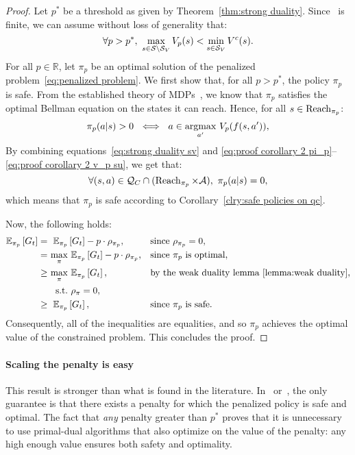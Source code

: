 \begin{proof}
	Let $p^*$ be a threshold as given by Theorem~\ref{thm:strong duality}. Since \Q~is finite, we can assume without loss of generality that:
	 \begin{equation}
	 \forall p > p^*,~\max_{s\in\mathcal{S}\setminus{\ensuremath{\mathcal{S}}_{V}}}V_p(s) < \min_{s\in{\ensuremath{\mathcal{S}}_{V}}}V^c(s). \label{eq:proof corollary 2 v_p su}
	 \end{equation}
	 For all $p\in\mathbb{R}$, let $\pi_p$ be an optimal solution of the penalized problem~\eqref{eq:penalized problem}.  We first show that, for all $p>p^*$, the policy $\pi_p$ is safe. From the established theory of MDPs~\cite{sutton2018reinforcement}, we know that $\pi_p$ satisfies the optimal Bellman equation on the states it can reach. Hence, for all $s\in\operatorname{Reach}_{\pi_p}$:
	\begin{equation}
		\pi_p(a|s) > 0~\iff~a \in \operatorname*{argmax}_{a'}\,V_p(f(s, a')),\label{eq:proof corollary 2 pi_p}
	\end{equation}
	By combining equations~\eqref{eq:strong duality sv} and \eqref{eq:proof corollary 2 pi_p}--\eqref{eq:proof corollary 2 v_p su}, we get that:
	$$
		\forall (s, a) \in \mathcal{Q}_{C}\cap(\operatorname{Reach}_{\pi_p}\times\mathcal{A}),~\pi_p(a|s) = 0,
	$$
	which means that $\pi_p$ is safe according to Corollary~\eqref{clry:safe policies on qc}.\par
	Now, the following holds:
	\begin{equation}
	\begin{alignedat}{5}
		\mathbb{E}_{\pi_p}\left[G_t\right] & =~&\mathbb{E}_{\pi_p}&\left[G_t\right] - p\cdot\rho_{\pi_p}, & &\quad\text{since}~\rho_{\pi_p} = 0,\\
		& =~&\max_\pi&~\mathbb{E}_{\pi_p}\left[G_t\right] - p\cdot\rho_{\pi_p},& &\quad\text{since}~\pi_p~\text{is optimal},\\
		& \geq~& \max_\pi&~\mathbb{E}_{\pi_p}\left[G_t\right],& &\quad\text{by the weak duality lemma~\ref{lemma:weak duality}},\\
		&		& \text{s.t.}&~\rho_\pi = 0,& &\\
		& \geq~& \mathbb{E}_{\pi_p}&\left[G_t\right], & &\quad\text{since}~\pi_p~\text{is safe}.
		\end{alignedat}\label{eq:proof corollary 2 duality}
	\end{equation}
	Consequently, all of the inequalities are equalities, and so $\pi_p$ achieves the optimal value of the constrained problem. This concludes the proof.
\end{proof}

\paragraph{Scaling the penalty is easy} This result is stronger than what is found in the literature. In~\cite{altman1999constrained} or~\cite{paternain2019safe}, the only guarantee is that there exists a penalty for which the penalized policy is safe and optimal. The fact that\emph{ any} penalty greater than $p^*$ proves that it is unnecessary to use primal-dual algorithms that also optimize on the value of the penalty: any high enough value ensures both safety and optimality.

